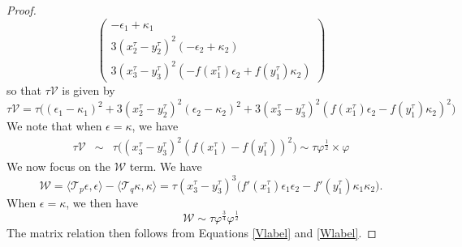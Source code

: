 \documentclass[10pt,a4paper]{amsart}
\begin{document}
\begin{proof}
\begin{equation*}
\begin{pmatrix}
 -\epsilon_1+\kappa_1\\
 3(x_2^\tau-y_2^\tau)^2(-\epsilon_2+\kappa_2)\\ 
 3(x_3^\tau-y_3^\tau)^2(-f(x_1^\tau)\epsilon_2+f(y_1^\tau)\kappa_2)
 \end{pmatrix}
\end{equation*}
so that $\tau \mathcal{V}$ is given by 
\begin{equation*}
\tau\mathcal{V} = \tau\bigg((\epsilon_1-\kappa_1)^2+ 3(x_2^\tau-y_2^\tau)^2(\epsilon_2-\kappa_2)^2+  3(x_3^\tau-y_3^\tau)^2(f(x_1^\tau)\epsilon_2-f(y_1^\tau)\kappa_2)^2\bigg)
\end{equation*}
We note that when $\epsilon=\kappa$, we have 
\begin{eqnarray}\label{Vlabel}
\tau \mathcal{V} & \sim & \tau\bigg((x_3^\tau-y_3^\tau)^2(f(x_1^\tau)-f(y_1^\tau))^2\bigg) \sim \tau \varphi^{\frac{1}{2}} \times \varphi
\end{eqnarray}
We now focus on the $\mathcal{W}$ term. We have 
\begin{equation*}
\mathcal{W}=\langle \mathcal{T}_p\epsilon,\epsilon\rangle-\langle \mathcal{T}_q\kappa,\kappa\rangle =
\tau (x_3^\tau-y_3^\tau)^3\bigg(f'(x_1^\tau)\epsilon_1\epsilon_2-f'(y_1^\tau)\kappa_1\kappa_2\bigg).
\end{equation*}
When $\epsilon=\kappa$, we then have 
\begin{equation}\label{Wlabel}
\mathcal{W}\sim \tau\varphi^{\frac{3}{4}}\varphi^{\frac{1}{2}}
\end{equation}
The matrix relation then follows from Equations \eqref{Vlabel} and \eqref{Wlabel}. 
\end{proof}
\end{document}
